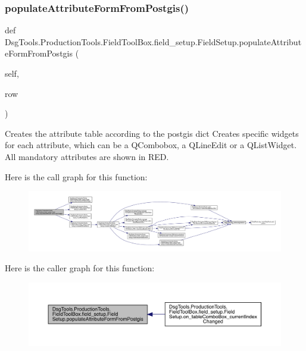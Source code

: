 \subsubsection{\texorpdfstring{populate\+Attribute\+Form\+From\+Postgis()}{populateAttributeFormFromPostgis()}}
{\footnotesize\ttfamily def Dsg\+Tools.\+Production\+Tools.\+Field\+Tool\+Box.\+field\+\_\+setup.\+Field\+Setup.\+populate\+Attribute\+Form\+From\+Postgis (\begin{DoxyParamCaption}\item[{}]{self,  }\item[{}]{row }\end{DoxyParamCaption})}

\begin{DoxyVerb}Creates the attribute table according to the postgis dict
Creates specific widgets for each attribute, which can be a QCombobox, a QLineEdit or a QListWidget.
All mandatory attributes are shown in RED.
\end{DoxyVerb}
 Here is the call graph for this function\+:
\nopagebreak
\begin{figure}[H]
\begin{center}
\leavevmode
\includegraphics[width=350pt]{class_dsg_tools_1_1_production_tools_1_1_field_tool_box_1_1field__setup_1_1_field_setup_a23cbaa8a07f0b9084a1700358d201a04_cgraph}
\end{center}
\end{figure}
Here is the caller graph for this function\+:
\nopagebreak
\begin{figure}[H]
\begin{center}
\leavevmode
\includegraphics[width=350pt]{class_dsg_tools_1_1_production_tools_1_1_field_tool_box_1_1field__setup_1_1_field_setup_a23cbaa8a07f0b9084a1700358d201a04_icgraph}
\end{center}
\end{figure}

